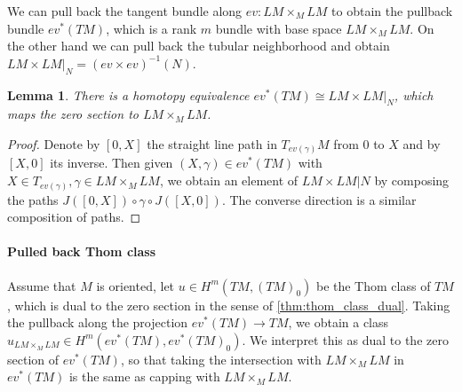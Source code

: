 \documentclass{scrartcl}
\theoremstyle{plain}
\newtheorem{lemma}[theorem]{Lemma}
\theoremstyle{definition}
\newcommand{\iso}{\cong}
\begin{document}
We can pull back the tangent bundle along $ev\colon LM\times_M LM$ to obtain the pullback bundle $ev^*(TM)$, which is a rank $m$ bundle with base space $LM\times_M LM$. On the other hand we can pull back the tubular neighborhood and obtain $LM\times LM|_N = (ev\times ev)^{-1}(N)$. \begin{lemma}
    There is a homotopy equivalence $ev^*(TM) \iso LM\times LM|_N$, which maps the zero section to $LM\times_M LM$. 
\end{lemma}
\begin{proof}
    Denote by $[0, X]$ the straight line path in $T_{ev(\gamma)}M$ from $0$ to $X$ and by $[X, 0]$ its inverse. Then given $(X, \gamma)\in ev^*(TM)$ with $X\in T_{ev(\gamma)}, \gamma\in LM\times_M LM$, we obtain an element of $LM\times LM|N$ by composing the paths $J([0, X]) \circ \gamma \circ J([X, 0])$. The converse direction is a similar composition of paths.
\end{proof}

\paragraph{Pulled back Thom class}

Assume that $M$ is oriented, let $u\in H^m(TM, (TM)_0)$ be the Thom class of $TM$, which is dual to the zero section in the sense of \ref{thm:thom_class_dual}. Taking the pullback along the projection $ev^*(TM)\to TM$, we obtain a class $u_{LM\times_M LM} \in H^m(ev^*(TM), ev^*(TM)_0)$. We interpret this as dual to the zero section of $ev^*(TM)$, so that taking the intersection with $LM\times_M LM$ in $ev^*(TM)$ is the same as capping with $LM\times_M LM$.


\end{document}
